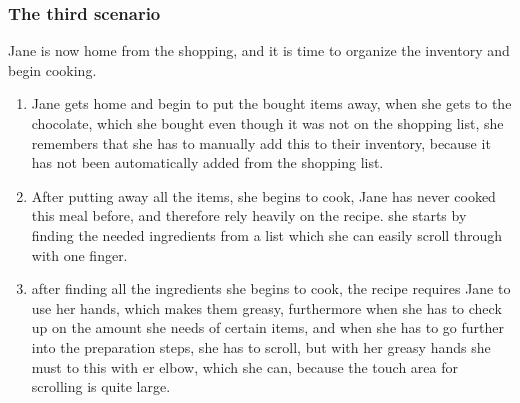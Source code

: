 \subsubsection{The third scenario}
Jane is now home from the shopping, and it is time to organize the inventory and begin cooking.
\begin{enumerate}
  \item Jane gets home and begin to put the bought items away, when she gets to the chocolate, which she bought even though it was not on the shopping list, she remembers that she has to manually add this to their inventory, because it has not been automatically added from the shopping list.
  \item After putting away all the items, she begins to cook, Jane has never cooked this meal before, and therefore rely heavily on the recipe. she starts by finding the needed ingredients from a list which she can easily scroll through with one finger.
  \item after finding all the ingredients she begins to cook, the recipe requires Jane to use her hands, which makes them greasy, furthermore when she has to check up on the amount she needs of certain items, and when she has to go further into the preparation steps, she has to scroll, but with her greasy hands she must to this with er elbow, which she can, because the touch area for scrolling is quite large. 
\end{enumerate}